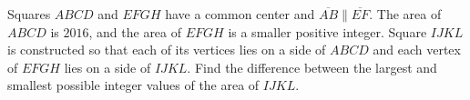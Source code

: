 Squares $ABCD$ and $EFGH$ have a common center and $\overline{AB}\parallel \overline{EF}$. The area of $ABCD$ is $2016$,  and the area of $EFGH$ is a smaller positive integer. Square $IJKL$ is constructed so that each of its vertices lies on a side of $ABCD$ and each vertex of $EFGH$ lies on a side of $IJKL$. Find the difference between the largest and smallest possible integer values of the area of $IJKL$.